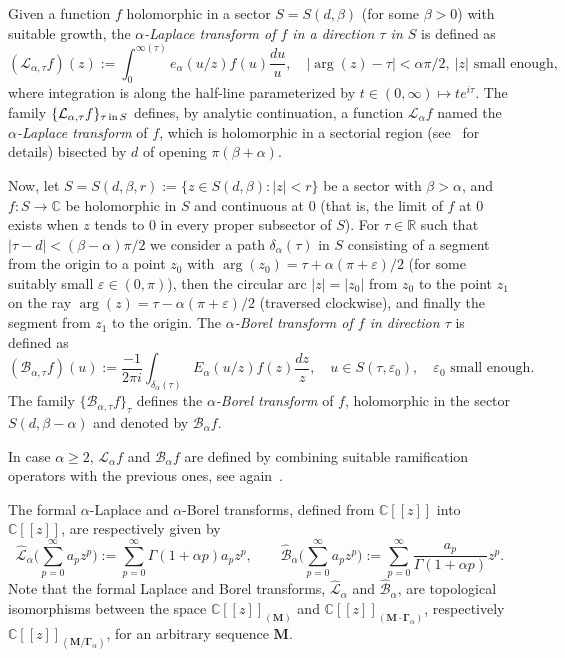 \documentclass[11pt,a4paper]{article}
\theoremstyle{plain}
\theoremstyle{definition}
\numberwithin{equation}{section}
\newcommand{\R}{\mathbb{R}}
\newcommand{\C}{\mathbb{C}}
\newcommand{\al}{\alpha}
\newcommand{\be}{\beta}
\newcommand{\M}{{\boldsymbol{M}}}
\newcommand{\bGa}{{\boldsymbol{\Gamma}}}
\begin{document}
Given a function $f$ holomorphic in a sector $S=S(d,\beta)$ (for some $\beta>0$) with suitable growth, the \textit{$\al$-Laplace transform of $f$ in a direction $\tau$ in $S$} is defined as
\begin{equation*}
	 (\mathcal{L}_{\al,\tau}f)(z):=\int_0^{\infty(\tau)}e_{\al}(u/z)f(u)\frac{du}{u},\quad
	|\arg(z)-\tau|<\al\pi/2,\ |z|\textrm{ small enough},
\end{equation*}
where integration is along the half-line parameterized by $t\in(0,\infty)\mapsto te^{i\tau}$. The family $\{\mathcal{L}_{\al,\tau}f\}_{\tau\textrm{\,in\,}S}$ defines, by analytic continuation, a function $\mathcal{L}_{\al}f$ named the \textit{$\al$-Laplace transform} of $f$, which is holomorphic in a sectorial region (see~\cite{balserutx} for details) bisected by $d$ of opening $\pi(\beta+\al)$.

Now, let $S=S(d,\be,r):=\{z\in S(d,\be)\colon |z|<r\}$ be a sector with $\be>\al$, and $f:S\to \C$ be holomorphic in $S$ and continuous at 0 (that is, the limit of $f$ at 0 exists when $z$ tends to 0 in every proper subsector of $S$). For $\tau\in\R$ such that $|\tau-d|<(\be-\al)\pi/2$ we consider a path
$\delta_{\al}(\tau)$ in $S$ consisting of a segment from the origin to a point $z_0$ with $\arg(z_0)=\tau+\al(\pi+\varepsilon)/2$ (for some
suitably small $\varepsilon\in(0,\pi)$), then the circular arc $|z|=|z_0|$ from $z_0$ to
the point $z_1$ on the ray $\arg(z)=\tau-\al(\pi+\varepsilon)/2$ (traversed clockwise), and
finally the segment from $z_1$ to the origin. The \textit{$\al$-Borel transform of $f$ in direction $\tau$} is defined as
$$
(\mathcal{B}_{\al,\tau}f)(u):=\frac{-1}{2\pi i}\int_{\delta_{\al}(\tau)}E_{\al}(u/z)f(z)\frac{dz}{z},\quad
u\in S(\tau,\varepsilon_0), \quad \varepsilon_0\textrm{ small enough}.
$$
The family
$\{\mathcal{B}_{\al,\tau}f\}_{\tau}$ defines the \textit{$\al$-Borel transform} of $f$, holomorphic in the sector $S(d,\be-\al)$ and denoted by $\mathcal{B}_{\al}f$.

In case $\al\ge 2$, $\mathcal{L}_{\al}f$ and $\mathcal{B}_{\al}f$ are defined by combining suitable ramification operators with the previous ones, see again~\cite{balserutx}.

The formal $\al$-Laplace and $\al$-Borel transforms, defined from $\C[[z]]$ into $\C[[z]]$, are respectively given by
$$\widehat{\mathcal{L}}_{\al}\big(\sum_{p=0}^{\infty}a_{p}z^{p}\big):= \sum_{p=0}^{\infty}\Gamma(1+\al p)a_{p}z^{p},\qquad \widehat{\mathcal{B}}_{\al}\big(\sum_{p=0}^{\infty}a_{p}z^{p}\big):= \sum_{p=0}^{\infty}\frac{a_{p}}{\Gamma(1+\al p)}z^{p}.$$
Note that the formal Laplace and Borel transforms, $\widehat{\mathcal{L}}_{\al}$ and $\widehat{\mathcal{B}}_{\al}$, are topological isomorphisms between the space $\C[[z]]_{(\M)}$ and $\C[[z]]_{(\M\cdot\bGa_{\al})}$, respectively $\C[[z]]_{(\M/\bGa_{\al})}$, for an arbitrary sequence $\M$.
\end{document}

